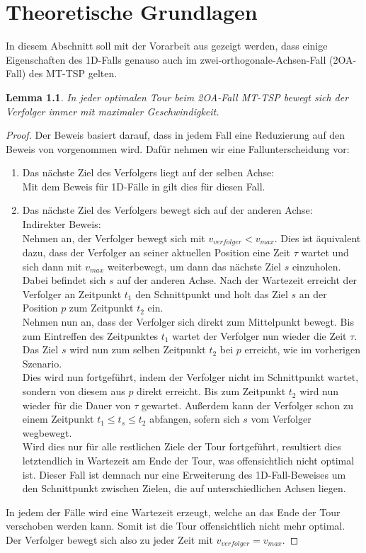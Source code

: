 \documentclass[german,version-2019-11]{uzl-thesis}
\newtheorem{lem}{Lemma}
\begin{document}
\chapter{Theoretische Grundlagen}

In diesem Abschnitt soll mit der Vorarbeit aus \cite{helvig} gezeigt werden, dass einige Eigenschaften des 1D-Falls genauso auch im zwei-orthogonale-Achsen-Fall (2OA-Fall) des MT-TSP gelten.

\begin{lem}
In jeder optimalen Tour beim 2OA-Fall MT-TSP bewegt sich der Verfolger immer mit maximaler Geschwindigkeit.
\end{lem}
 
\begin{proof}
Der Beweis basiert darauf, dass in jedem Fall eine Reduzierung auf den Beweis von \cite{helvig} vorgenommen wird. Dafür nehmen wir eine Fallunterscheidung vor:
\begin{enumerate}
\item Das nächste Ziel des Verfolgers liegt auf der selben Achse: \\
Mit dem Beweis für 1D-Fälle in \cite{helvig} gilt dies für diesen Fall.

\item Das nächste Ziel des Verfolgers bewegt sich auf der anderen Achse: \\
Indirekter Beweis: \\
Nehmen an, der Verfolger bewegt sich mit $v_{verfolger} < v_{max}$. Dies ist äquivalent dazu, dass der Verfolger an seiner aktuellen Position eine Zeit $\tau$ wartet und sich dann mit $v_{max}$ weiterbewegt, um dann das nächste Ziel $s$ einzuholen. Dabei befindet sich $s$ auf der anderen Achse. Nach der Wartezeit erreicht der Verfolger an Zeitpunkt $t_1$ den Schnittpunkt und holt das Ziel $s$ an der Position $p$ zum Zeitpunkt $t_2$ ein. \\
Nehmen nun an, dass der Verfolger sich direkt zum Mittelpunkt bewegt. Bis zum Eintreffen des Zeitpunktes $t_1$ wartet der Verfolger nun wieder die Zeit $\tau$. Das Ziel $s$ wird nun zum selben Zeitpunkt $t_2$ bei $p$ erreicht, wie im vorherigen Szenario. \\
Dies wird nun fortgeführt, indem der Verfolger nicht im Schnittpunkt wartet, sondern von diesem aus $p$ direkt erreicht. Bis zum Zeitpunkt $t_2$ wird nun wieder für die Dauer von $\tau$ gewartet. Außerdem kann der Verfolger schon zu einem Zeitpunkt $t_1 \leq t_{s} \leq t_2$ abfangen, sofern sich $s$ vom Verfolger wegbewegt. \\
Wird dies nur für alle restlichen Ziele der Tour fortgeführt, resultiert dies letztendlich in Wartezeit am Ende der Tour, was offensichtlich nicht optimal ist. Dieser Fall ist demnach nur eine Erweiterung des 1D-Fall-Beweises um den Schnittpunkt zwischen Zielen, die auf unterschiedlichen Achsen liegen. 
\end{enumerate}

In jedem der Fälle wird eine Wartezeit erzeugt, welche an das Ende der Tour \\verschoben werden kann. Somit ist die Tour offensichtlich nicht mehr optimal. Der Verfolger bewegt sich also zu jeder Zeit mit $v_{verfolger} = v_{max}$.
\end{proof}
\end{document}
